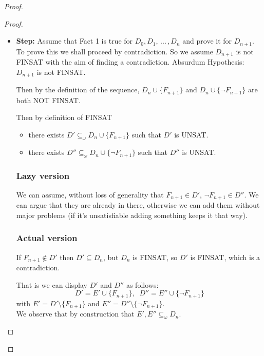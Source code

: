 \begin{proof}
\begin{proof}
\begin{itemize}
				\item \textbf{Step:} Assume that Fact 1 is true for $D_0, D_1, \, ... \, , D_n$ and prove it for $D_{n+1}$. To prove this we shall proceed by contradiction. So we assume $D_{n+1}$ is not FINSAT with the aim of finding a contradiction. Absurdum Hypothesis: $D_{n+1}$ is not FINSAT.

				Then by the definition of the sequence, $D_n \cup \{F_{n+1}\}$ and $D_n \cup \{\neg F_{n+1}\}$ are both NOT FINSAT.

				Then by definition of FINSAT
				\begin{itemize}
					\item there exists
					$ D' \subseteq_\omega D_{n} \cup \{F_{n+1}\} $
					such that $D'$ is UNSAT.

					\item  there exists
					$ D'' \subseteq_\omega D_{n} \cup \{ \neg F_{n+1}\} $
					such that $D''$ is UNSAT.
				\end{itemize} \vspace{-0.25cm}

				\subsubsection{Lazy version}

				We can assume, without loss of generality that $F_{n+1} \in D'$, $\neg F_{n+1} \in D''$. We can argue that they are already in there, otherwise we can add them without major problems (if it's unsatisfiable adding something keeps it that way). \vspace{-0.25cm}

				\subsubsection{Actual version}

				If $F_{n+1} \notin D'$ then $D' \subseteq D_n$, but $D_n$ is FINSAT, so $D'$ is FINSAT, which is a contradiction.

				\newpage

				That is we can display $D'$ and $D''$ as follows:
				$$ D' = E' \cup \{F_{n+1}\}, \;\; D'' = E'' \cup \{\neg F_{n+1}\}$$
				with $E' = D' \setminus \{F_{n+1}\}$ and $E'' = D'' \setminus \{\neg F_{n+1}\}$.\\

				We observe that by construction that $E', E'' \subseteq_\omega D_n$.\\



\end{itemize}
\end{proof}
\end{proof}
